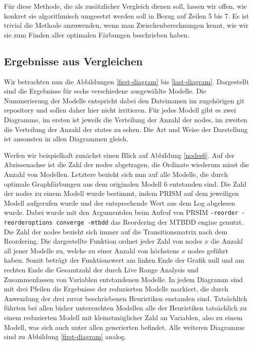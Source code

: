 \documentclass[a4paper]{article}
\theoremstyle{nonumberplain}
\begin{document}
Für diese Methode, die als zusätzlicher Vergleich dienen soll, lassen wir offen, wie konkret sie algorithmisch umgesetzt werden soll in Bezug auf Zeilen 5 bis 7. Es ist trivial die Methode anzuwenden, wenn man Zwischenberechnungen kennt, wie wir sie zum Finden aller optimalen Färbungen beschrieben haben.


\subsection{Ergebnisse aus Vergleichen}

Wir betrachten nun die Abbildungen \ref{first-diagram} bis \ref{last-diagram}. Dargestellt sind die Ergebnisse für sechs verschiedene ausgewählte Modelle. Die Nummerierung der Modelle entspricht dabei den Dateinamen im zugehörigen git repository und sollen daher hier nicht irritieren. Für jedes Modell gibt es zwei Diagramme, im ersten ist jeweils die Verteilung der Anzahl der nodes, im zweiten die Verteilung der Anzahl der states zu sehen. Die Art und Weise der Darstellung ist ansonsten in allen Diagrammen gleich.

Werfen wir beispielhaft zunächst einen Blick auf Abbildung \ref{nodes6}. Auf der Abzissenachse ist die Zahl der nodes abgetragen, die Ordinate wiederum misst die Anzahl von Modellen. Letztere bezieht sich nun auf alle Modelle, die durch optimale Graphfärbungen aus dem originalen Modell 6 entstanden sind. Die Zahl der nodes zu einem Modell wurde bestimmt, indem PRISM auf dem jeweiligen Modell aufgerufen wurde und der entsprechende Wert aus dem Log abgelesen wurde. Dabei wurde mit den Argumentden beim Aufruf von PRSIM \texttt{-reorder -reorderoptions converge -mtbdd} das Reordering der MTBDD engine genutzt. Die Zahl der nodes bezieht sich immer auf die Transitionsmatrix nach dem Reordering.
Die dargestellte Funktion ordnet jeder Zahl von nodes $x$ die Anzahl all jener Modelle zu, welche zu einer Anzahl von höchstens $x$ nodes geführt haben. Somit beträgt der Funktionswert am linken Ende der Grafik null und am rechten Ende die Gesamtzahl der durch Live Range Analysis und Zusammenfassen von Variablen entstandenen Modelle. In jedem Diagramm sind mit drei Pfeilen die Ergebnisse der reduzierten Modelle markiert, die durch Anwendung der drei zuvor beschriebenen Heuristiken enstanden sind. Tatsächlich führten bei allen bisher untersuchten Modellen alle der Heuristiken tatsächlich zu einem reduzierten Modell mit kleinstmöglicher Zahl an Variablen, also zu einem Modell, was sich auch unter allen generierten befindet.
Alle weiteren Diagramme sind zu Abbildung \ref{first-diagram} analog.
\end{document}

